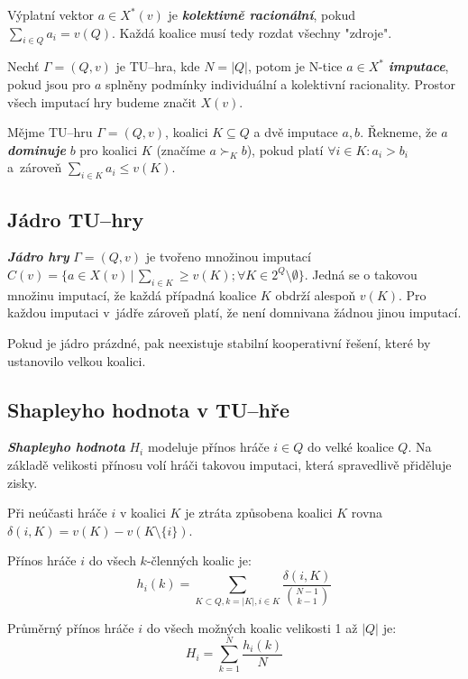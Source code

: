         Výplatní vektor $a \in X^*(v)$ je \textit{\textbf{kolektivně racionální}}, pokud $\sum_{i \in Q}a_i = v(Q)$. Každá koalice musí tedy rozdat všechny "zdroje".

        Nechť $\Gamma = (Q, v)$ je TU--hra, kde $N = |Q|$, potom je N-tice $a \in X^*$ \textit{\textbf{imputace}}, pokud jsou pro $a$ splněny podmínky individuální a kolektivní racionality. Prostor všech imputací hry budeme značit $X(v)$.

        Mějme TU--hru $\Gamma = (Q, v)$, koalici $K \subseteq Q$ a dvě imputace $a, b$. Řekneme, že $a$ \textit{\textbf{dominuje}} $b$ pro koalici $K$ (značíme $a \succ_K b$), pokud platí $\forall i \in K: a_i > b_i$ a~zároveň $\sum_{i \in K}a_i \leq v(K)$.

    \subsection{Jádro TU--hry}
        \textit{\textbf{Jádro hry}} $\Gamma = (Q, v)$ je tvořeno množinou imputací $C(v) = \{a \in X(v)\,|\,\sum_{i \in K} \geq v(K); \forall K \in 2^Q \setminus \emptyset\}$. Jedná se o takovou množinu imputací, že každá případná koalice $K$ obdrží alespoň $v(K)$. Pro každou imputaci v~jádře zároveň platí, že není domnivana žádnou jinou imputací.

        Pokud je jádro prázdné, pak neexistuje stabilní kooperativní řešení, které by ustanovilo velkou koalici.

    \subsection{Shapleyho hodnota v TU--hře}
        \textit{\textbf{Shapleyho hodnota}} \cite{Shapley1953} $H_i$ modeluje přínos hráče $i \in Q$ do velké koalice $Q$. Na základě velikosti přínosu  volí hráči takovou imputaci, která spravedlivě přiděluje zisky.

        Při neúčasti hráče $i$ v koalici $K$ je ztráta způsobena koalici $K$ rovna $\delta(i, K) = v(K) - v(K \setminus \{i\})$.

        Přínos hráče $i$ do všech $k$-členných koalic je:
        \vspace*{-0.3em}
        $$
        h_i(k) = \sum_{K \subset Q, k = |K|, i \in K}\frac{\delta(i, K)}{{{N-1} \choose {k-1}}}
        $$

        Průměrný přínos hráče $i$ do všech možných koalic velikosti 1 až $|Q|$ je:
        \vspace*{-0.3em}
        $$
        H_i = \sum^N_{k = 1}\frac{h_i(k)}{N}
        $$


